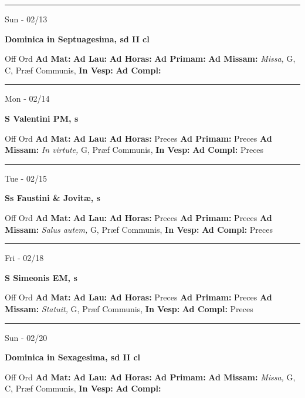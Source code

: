 \documentclass[letterpaper, 10pt]{article}
\begin{document}
\hrule
\begin{center}
Sun - 02/13
\end{center}\textbf{ \large Dominica in Septuagesima, \textnormal{\normalsize sd II cl}}
\begin{justify}
Off Ord
\textbf{Ad Mat: }
\textbf{Ad Lau: }
\textbf{Ad Horas: }
\textbf{Ad Primam: }
\textbf{Ad Missam:} \textit{Missa, } G, C, Præf Communis, 
\textbf{In Vesp: }
\textbf{Ad Compl: }\end{justify}



\hrule
\begin{center}
Mon - 02/14
\end{center}\textbf{ \large S Valentini PM, \textnormal{\normalsize s}}
\begin{justify}
Off Ord
\textbf{Ad Mat: }
\textbf{Ad Lau: }
\textbf{Ad Horas: }Preces
\textbf{Ad Primam: }Preces
\textbf{Ad Missam:} \textit{In virtute, } G, Præf Communis, 
\textbf{In Vesp: }
\textbf{Ad Compl: }Preces\end{justify}



\hrule
\begin{center}
Tue - 02/15
\end{center}\textbf{ \large Ss Faustini \& Jovitæ, \textnormal{\normalsize s}}
\begin{justify}
Off Ord
\textbf{Ad Mat: }
\textbf{Ad Lau: }
\textbf{Ad Horas: }Preces
\textbf{Ad Primam: }Preces
\textbf{Ad Missam:} \textit{Salus autem, } G, Præf Communis, 
\textbf{In Vesp: }
\textbf{Ad Compl: }Preces\end{justify}



\hrule
\begin{center}
Fri - 02/18
\end{center}\textbf{ \large S Simeonis EM, \textnormal{\normalsize s}}
\begin{justify}
Off Ord
\textbf{Ad Mat: }
\textbf{Ad Lau: }
\textbf{Ad Horas: }Preces
\textbf{Ad Primam: }Preces
\textbf{Ad Missam:} \textit{Statuit, } G, Præf Communis, 
\textbf{In Vesp: }
\textbf{Ad Compl: }Preces\end{justify}



\hrule
\begin{center}
Sun - 02/20
\end{center}\textbf{ \large Dominica in Sexagesima, \textnormal{\normalsize sd II cl}}
\begin{justify}
Off Ord
\textbf{Ad Mat: }
\textbf{Ad Lau: }
\textbf{Ad Horas: }
\textbf{Ad Primam: }
\textbf{Ad Missam:} \textit{Missa, } G, C, Præf Communis, 
\textbf{In Vesp: }
\textbf{Ad Compl: }\end{justify}
\end{document}
